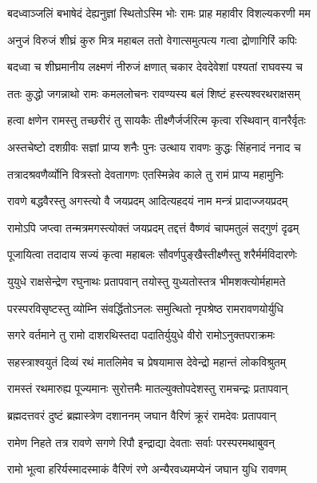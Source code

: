 \twolineshloka
{बदध्वाञ्जलिं बभाषेदं देह्यनुज्ञां स्थितोऽस्मि भोः}
{रामः प्राह महावीर विशल्यकरणी मम} %

\twolineshloka
{अनुजं विरुजं शीघ्रं कुरु मित्र महाबल}
{ततो वेगात्समुत्पत्य गत्वा द्रोणागिरिं कपिः} %

\twolineshloka
{बदध्वा च शीघ्रमानीय लक्ष्मणं नीरुजं क्षणात्}
{चकार देवदेवेशां पश्यतां राघवस्य च} %

\twolineshloka
{ततः कुद्धो जगन्नाथो रामः कमललोचनः}
{रावण्यस्य बलं शिष्टं हस्त्यश्वरथराक्षसम्} %

\twolineshloka
{हत्वा क्षणेन रामस्तु तच्छरीरं तु सायकैः}
{तीक्ष्णैर्जर्जरित्म कृत्वा रस्थिवान् वानरैर्वृतः} %

\twolineshloka
{अस्तचेष्टो दशग्रीवः सज्ञां प्राप्य शनैः पुनः}
{उत्थाय रावणः कुद्धः सिंहनादं ननाद च} %

\twolineshloka
{तत्रादश्रवणैर्व्योनि वित्रस्तो देवतागणः}
{एतस्मिन्नेव काले तु रामं प्राप्य महामुनिः} %

\twolineshloka
{रावणे बद्धवैरस्तु अगस्त्यो वै जयप्रदम्}
{आदित्यहदयं नाम मन्त्रं प्रादाज्जयप्रदम्} %

\twolineshloka
{रामोऽपि जप्त्वा तन्मत्रमगस्त्योक्तं जयप्रदम्}
{तद्दत्तं वैष्णवं चापमतुलं सद्गुणं दृढम्} %

\twolineshloka
{पूजायित्वा तदादाय सज्यं कृत्वा महाबलः}
{सौवर्णपुङ्खैस्तीक्ष्णैस्तु शरैर्मर्मविदारणेः} %

\twolineshloka
{युयुधे राक्षसेन्द्रेण रघुनाथः प्रतापवान्}
{तयोस्तु युध्यतोस्तत्र भीमशक्त्योर्महामते} %

\twolineshloka
{परस्परविसृष्टस्तु व्योम्नि संवर्द्धितोऽनलः}
{समुत्थितो नृपश्रेष्ठ रामरावणयोर्युधि} %

\twolineshloka
{सगरे वर्तमाने तु रामो दाशरथिस्तदा}
{पदातिर्युयुधे वीरो रामोऽनुक्तपराक्रमः} %

\twolineshloka
{सहस्त्राश्वयुतं दिव्यं रथं मातलिमेव च}
{प्रेषयामास देवेन्द्रो महान्तं लोकविश्रुतम्} %

\twolineshloka
{रामस्तं रथमारुह्य पूज्यमानः सुरोत्तमैः}
{मातल्युक्तोपदेशस्तु रामचन्द्रः प्रतापवान्} %

\twolineshloka
{ब्रह्मदत्तवरं दुष्टं ब्रह्मास्त्रेण दशाननम्}
{जघान वैरिणं क्रूरं रामदेवः प्रतापवान्} %

\twolineshloka
{रामेण निहते तत्र रावणे सगणे रिपौ}
{इन्द्राद्या देवताः सर्वाः परस्परमथाबुवन्} %

\twolineshloka
{रामो भूत्वा हरिर्यस्मादस्माकं वैरिणं रणे}
{अन्यैरवध्यमप्येनं जघान युधि रावणम्} %

